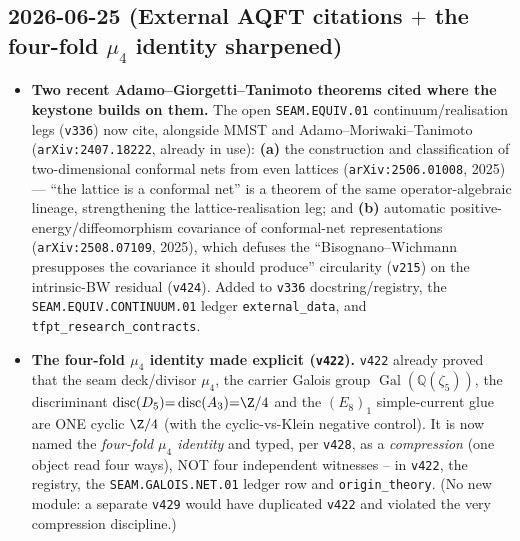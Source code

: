 \documentclass[11pt]{article}
\providecommand{\vref}[1]{\texttt{#1}}
\begin{document}
\subsection*{2026-06-25 (External AQFT citations $+$ the four-fold $\mu_4$ identity sharpened)}
\begin{itemize}
\item \textbf{Two recent Adamo--Giorgetti--Tanimoto theorems cited where the keystone builds on them.}
The open \texttt{SEAM.EQUIV.01} continuum/realisation legs (\vref{v336}) now cite, alongside MMST and
Adamo--Moriwaki--Tanimoto (\texttt{arXiv:2407.18222}, already in use): \textbf{(a)} the construction and
classification of two-dimensional conformal nets from even lattices (\texttt{arXiv:2506.01008}, 2025) ---
``the lattice is a conformal net'' is a theorem of the same operator-algebraic lineage, strengthening the
lattice-realisation leg; and \textbf{(b)} automatic positive-energy/diffeomorphism covariance of conformal-net
representations (\texttt{arXiv:2508.07109}, 2025), which defuses the ``Bisognano--Wichmann presupposes the
covariance it should produce'' circularity (\vref{v215}) on the intrinsic-BW residual (\vref{v424}). Added to
\vref{v336} docstring/registry, the \texttt{SEAM.EQUIV.CONTINUUM.01} ledger \texttt{external\_data}, and
\texttt{tfpt\_research\_contracts}.
\item \textbf{The four-fold $\mu_4$ identity made explicit (\vref{v422}).} \vref{v422} already proved that the
seam deck/divisor $\mu_4$, the carrier Galois group $\operatorname{Gal}(\mathbb Q(\zeta_5))$, the discriminant
$\operatorname{disc}(D_5){=}\operatorname{disc}(A_3){=}\Z/4$ and the $(E_8)_1$ simple-current glue are ONE cyclic
$\Z/4$ (with the cyclic-vs-Klein negative control). It is now named the \emph{four-fold $\mu_4$ identity} and
typed, per \vref{v428}, as a \emph{compression} (one object read four ways), NOT four independent witnesses --
in \vref{v422}, the registry, the \texttt{SEAM.GALOIS.NET.01} ledger row and \texttt{origin\_theory}. (No new
module: a separate \texttt{v429} would have duplicated \vref{v422} and violated the very compression discipline.)
\end{itemize}
\end{document}
